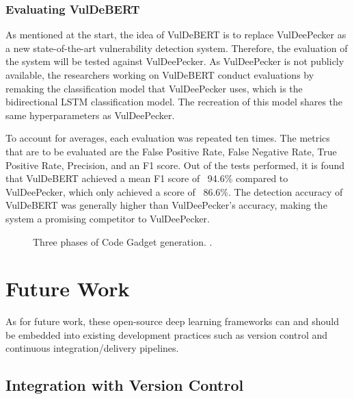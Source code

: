 \documentclass[12pt,twocolumn,letterpaper]{article}
\begin{document}
\subsubsection{Evaluating VulDeBERT}
As mentioned at the start, the idea of VulDeBERT is to replace VulDeePecker as a new state-of-the-art vulnerability detection system. Therefore, the evaluation of the system will be
tested against VulDeePecker. As VulDeePecker is not publicly available, the researchers working on VulDeBERT conduct evaluations by remaking the classification model that
VulDeePecker uses, which is the bidirectional LSTM classification model. The recreation of this model shares the same hyperparameters as VulDeePecker.

To account for averages, each evaluation was repeated ten times. The metrics that are to be evaluated are the False Positive Rate, False Negative Rate, True
Positive Rate, Precision, and an F1 score. Out of the tests performed, it is found that VulDeBERT achieved a mean F1 score of ~94.6\% compared to VulDeePecker, which only achieved a score of ~86.6\%. The detection accuracy of VulDeBERT was generally higher than VulDeePecker's accuracy, making the system a promising competitor
to VulDeePecker.

\begin{figure}[h!]
    \centering
    \caption{Three phases of Code Gadget generation. \cite{Kim22}.}
    \label{fig:af-4}
\end{figure}

\section{Future Work}
\label{sec:future-work}

As for future work, these open-source deep learning frameworks can and should be embedded into existing 
development practices such as version control and continuous integration/delivery pipelines.

\subsection{Integration with Version Control}
\label{sub:integrating-with-version-control}
\end{document}
